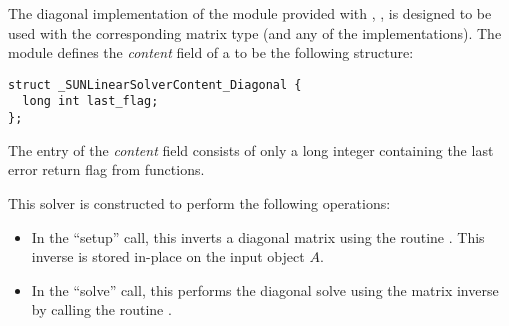 
The diagonal implementation of the {\sunlinsol} module provided with
{\sundials}, {\sunlinsoldiag}, is designed to be used with the
corresponding {\sunmatdiag} matrix type (and any of the {\nvector}
implementations).  The {\sunlinsoldiag} module defines the
{\em content} field of a  to be the following
structure:
\begin{verbatim} 
struct _SUNLinearSolverContent_Diagonal {
  long int last_flag;
};
\end{verbatim}
The entry of the \emph{content} field consists of only a long integer
containing the last error return flag from {\sunlinsoldiag} functions.

This solver is constructed to perform the following operations:
\begin{itemize}
\item In the ``setup'' call, this inverts a diagonal matrix using the
  {\nvector} routine .  This inverse is stored
  in-place on the input {\sunmatdiag} object $A$.
\item In the ``solve'' call, this performs the diagonal solve using
  the matrix inverse by calling the {\nvector} routine .
\end{itemize}

